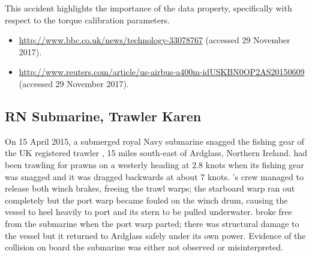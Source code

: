 This accident highlights the importance of the  \gls{data property}, specifically with respect to the torque calibration parameters.

\begin{samepage}
\begin{itemize}
  \item \raggedright{\href{http://www.bbc.co.uk/news/technology-33078767}{http://www.bbc.co.uk/news/technology-33078767} (accessed 29 November 2017).}
  \item \raggedright{\href{http://www.reuters.com/article/us-airbus-a400m-idUSKBN0OP2AS20150609}{http://www.reuters.com/article/us-airbus-a400m-idUSKBN0OP2AS20150609} (accessed 29 November 2017).}
\end{itemize}
\end{samepage}


\subsection{RN Submarine, Trawler Karen} \label{bkm:incacc:subtrawler}
On 15 April 2015, a submerged royal Navy submarine snagged the fishing gear of the UK registered trawler , 15 miles south-east of Ardglass, Northern Ireland.  had been trawling for prawns on a westerly heading at 2.8 knots when its fishing gear was snagged and it was dragged backwards at about 7 knots. 's crew managed to release both winch brakes, freeing the trawl warps; the starboard warp ran out completely but the port warp became fouled on the winch drum, causing the vessel to heel heavily to port and its stern to be pulled underwater.  broke free from the submarine when the port warp parted; there was structural damage to the vessel but it returned to Ardglass safely under its own power. Evidence of the collision on board the submarine was either not observed or misinterpreted. 

